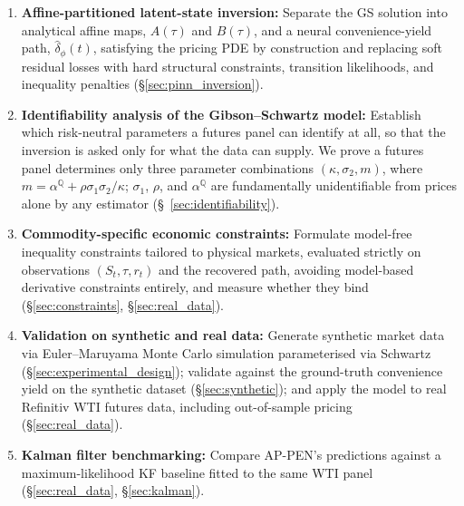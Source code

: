 \documentclass[11pt, a4paper]{article}
\begin{document}
\begin{enumerate}[noitemsep]
    \item \textbf{Affine-partitioned latent-state inversion:} Separate the GS solution into analytical affine maps, $A(\tau)$ and $B(\tau)$, and a neural convenience-yield path, $\hat{\delta}_\phi(t)$, satisfying the pricing PDE by construction and replacing soft residual losses with hard structural constraints, transition likelihoods, and inequality penalties (\S\ref{sec:pinn_inversion}).
    \item \textbf{Identifiability analysis of the Gibson--Schwartz model:} Establish which risk-neutral parameters a futures panel can identify at all, so that the inversion is asked only for what the data can supply. We prove a futures panel determines only three parameter combinations $(\kappa, \sigma_2, m)$, where $m = \alpha^{\mathbb{Q}} + \rho\sigma_1\sigma_2/\kappa$; $\sigma_1$, $\rho$, and $\alpha^{\mathbb{Q}}$ are fundamentally unidentifiable from prices alone by any estimator (\S~\ref{sec:identifiability}).
    \item \textbf{Commodity-specific economic constraints:} Formulate model-free inequality constraints tailored to physical markets, evaluated strictly on observations $(S_t, \tau, r_t)$ and the recovered path, avoiding model-based derivative constraints entirely, and measure whether they bind (\S\ref{sec:constraints}, \S\ref{sec:real_data}).
    \item \textbf{Validation on synthetic and real data:} Generate synthetic market data via Euler--Maruyama Monte Carlo simulation parameterised via Schwartz~\cite{Schwartz1997TheHedging} (\S\ref{sec:experimental_design}); validate against the ground-truth convenience yield on the synthetic dataset (\S\ref{sec:synthetic}); and apply the model to real Refinitiv WTI futures data, including out-of-sample pricing (\S\ref{sec:real_data}).
    \item \textbf{Kalman filter benchmarking:} Compare AP-PEN's predictions against a maximum-likelihood KF baseline fitted to the same WTI panel (\S\ref{sec:real_data}, \S\ref{sec:kalman}).
\end{enumerate}


\end{document}
